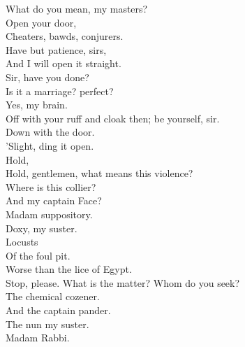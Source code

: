 \documentclass[a4paper,oneside,12pt]{memoir}
\begin{document}
\begin{drama*}
\lovewitspeaks What do you mean, my masters?\\
\mammonspeaks {} Open your door,\\
Cheaters, bawds, conjurers.\\
\lovewitspeaks {} Have but patience, sirs,\\
And I will open it straight.\\
\facespeaks {} Sir, have you done?\\
Is it a marriage? perfect?\\
\lovewitspeaks {} Yes, my brain.\\
\facespeaks Off with your ruff and cloak then; be yourself, sir.\\
\surlyspeaks Down with the door.\\
\kastrilspeaks {} 'Slight, ding it open.\\
\lovewitspeaks {} Hold,\\
Hold, gentlemen, what means this violence?\\
\mammonspeaks Where is this collier?\\
\surlyspeaks {} And my captain Face?\\
\mammonspeaks Madam suppository.\\
\kastrilspeaks {} Doxy, my suster.\\
\persecutionspeaks {} Locusts\\
Of the foul pit.\\
\tribulationspeaks {} Worse than the lice of Egypt.\\
\lovewitspeaks Stop, please. What is the matter? Whom do you seek?\\
\mammonspeaks The chemical cozener.\\
\surlyspeaks {} And the captain pander.\\
\kastrilspeaks The nun my suster.\\
\mammonspeaks {} Madam Rabbi.\\

\end{drama*}
\end{document}
